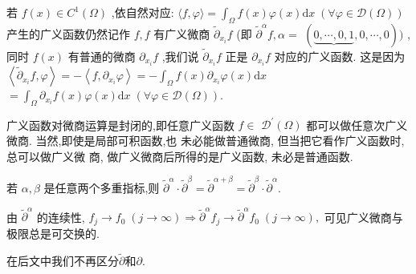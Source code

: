 \documentclass[lang=cn,newtx,10pt,scheme=chinese,thmcnt=chapter]{elegantbook}
\begin{document}
\begin{note}
     若 \( f\left( x\right)  \in  {C}^{1}\left( \Omega \right) \) ,依自然对应:
\( \langle f,\varphi \rangle  = {\int }_{\Omega }f\left( x\right) \varphi \left( x\right) \mathrm{d}x\;\left( {\forall \varphi  \in  \mathcal{D}\left( \Omega \right) }\right) \)
产生的广义函数仍然记作 \( f,f \) 有广义微商 \( {\widetilde{\partial }}_{{x}_{i}}f \) (即 \( {\widetilde{\partial }}^{\alpha }f,\alpha  = \)
\( \left( {\underbrace{0,\cdots ,0,1},0,\cdots ,0}\right) ) \) ,同时 \( f\left( x\right) \) 有普通的微商 \( {\partial }_{{x}_{i}}f \) ,我们说 \( {\widetilde{\partial }}_{{x}_{i}}f \)
正是 \( {\partial }_{{x}_{i}}f \) 对应的广义函数. 这是因为
\( \left\langle  {{\widetilde{\partial }}_{{x}_{i}}f,\varphi }\right\rangle   =  - \left\langle  {f,{\partial }_{{x}_{i}}\varphi }\right\rangle   =  - {\int }_{\Omega }f\left( x\right) {\partial }_{{x}_{i}}\varphi \left( x\right) \mathrm{d}x \)
\( = {\int }_{\Omega }{\partial }_{{x}_{i}}f\left( x\right) \varphi \left( x\right) \mathrm{d}x\;\left( {\forall \varphi  \in  \mathcal{D}\left( \Omega \right) }\right) . \)

广义函数对微商运算是封闭的,即任意广义函数 \( f \in \)
\( {\mathcal{D}}^{\prime }\left( \Omega \right) \) 都可以做任意次广义微商. 当然,即使是局部可积函数,也
未必能做普通微商, 但当把它看作广义函数时, 总可以做广义微
商, 做广义微商后所得的是广义函数, 未必是普通函数.

若 \( \alpha ,\beta \) 是任意两个多重指标,则
\( {\widetilde{\partial }}^{\alpha } \cdot  {\widetilde{\partial }}^{\beta } = {\widetilde{\partial }}^{\alpha  + \beta } = {\widetilde{\partial }}^{\beta } \cdot  {\widetilde{\partial }}^{\alpha }. \)

由 \( {\widetilde{\partial }}^{\alpha } \) 的连续性,
\( {f}_{j} \rightarrow  {f}_{0}\;\left( {j \rightarrow  \infty }\right)  \Rightarrow  {\widetilde{\partial }}^{\alpha }{f}_{j} \rightarrow  {\widetilde{\partial }}^{\alpha }{f}_{0}\;\left( {j \rightarrow  \infty }\right) , \)
可见广义微商与极限总是可交换的.

在后文中我们不再区分$\widetilde{\partial}$和$\partial$.
\end{note}
\end{document}
